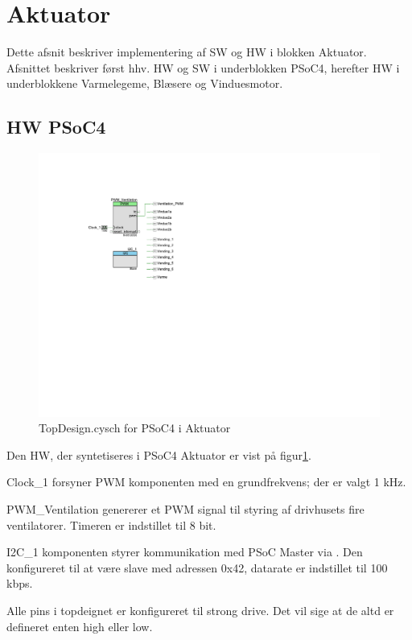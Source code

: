 \section{Aktuator} \label{sec:AktImpl}

Dette afsnit beskriver implementering af SW og HW i blokken Aktuator. Afsnittet beskriver først hhv. HW og SW i underblokken PSoC4, herefter HW i underblokkene Varmelegeme, Blæsere og Vinduesmotor.

\subsection{HW PSoC4}
\begin{figure}[h]
\centering 
\includegraphics[width={\textwidth-6cm}, trim = 110 320 480 100, clip=true] {../fig/TopDesign_Aktuator.pdf}
\caption{TopDesign.cysch for PSoC4 i Aktuator}
\label{fig:topdesign_aktuator}
\end{figure}

Den HW, der syntetiseres i PSoC4 Aktuator er vist på figur\ref{fig:topdesign_aktuator}. 

Clock\_1 forsyner PWM komponenten med en grundfrekvens; der er valgt 1 kHz.

PWM\_Ventilation genererer et PWM signal til styring af drivhusets fire ventilatorer. Timeren er indstillet til 8 bit.  

I2C\_1 komponenten styrer kommunikation med PSoC Master via \IIC. 
Den konfigureret til at være slave med adressen 0x42, datarate er indstillet til 100 kbps.

Alle pins i topdeignet er konfigureret til strong drive. 
Det vil sige at de altd er defineret enten high eller low.

